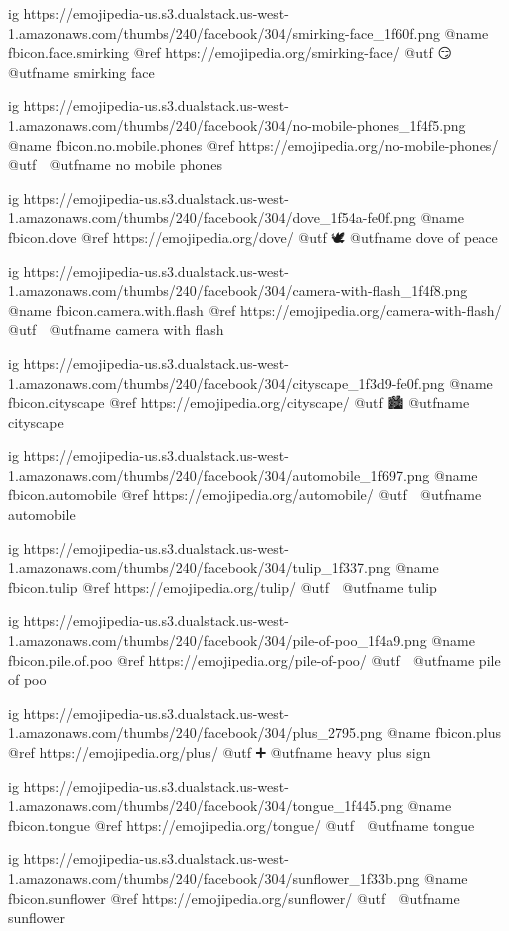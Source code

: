   ig https://emojipedia-us.s3.dualstack.us-west-1.amazonaws.com/thumbs/240/facebook/304/smirking-face_1f60f.png
  @name fbicon.face.smirking
  @ref https://emojipedia.org/smirking-face/
  @utf 😏
  @utfname smirking face

  ig https://emojipedia-us.s3.dualstack.us-west-1.amazonaws.com/thumbs/240/facebook/304/no-mobile-phones_1f4f5.png
  @name fbicon.no.mobile.phones
  @ref https://emojipedia.org/no-mobile-phones/
  @utf 📵
  @utfname no mobile phones

  ig https://emojipedia-us.s3.dualstack.us-west-1.amazonaws.com/thumbs/240/facebook/304/dove_1f54a-fe0f.png
  @name fbicon.dove
  @ref https://emojipedia.org/dove/
  @utf 🕊️
  @utfname dove of peace

  ig https://emojipedia-us.s3.dualstack.us-west-1.amazonaws.com/thumbs/240/facebook/304/camera-with-flash_1f4f8.png
  @name fbicon.camera.with.flash
  @ref https://emojipedia.org/camera-with-flash/
  @utf 📸
  @utfname camera with flash

  ig https://emojipedia-us.s3.dualstack.us-west-1.amazonaws.com/thumbs/240/facebook/304/cityscape_1f3d9-fe0f.png
  @name fbicon.cityscape
  @ref https://emojipedia.org/cityscape/
  @utf 🏙️
  @utfname cityscape

  ig https://emojipedia-us.s3.dualstack.us-west-1.amazonaws.com/thumbs/240/facebook/304/automobile_1f697.png
  @name fbicon.automobile
  @ref https://emojipedia.org/automobile/
  @utf 🚗
  @utfname automobile

  ig https://emojipedia-us.s3.dualstack.us-west-1.amazonaws.com/thumbs/240/facebook/304/tulip_1f337.png
  @name fbicon.tulip
  @ref https://emojipedia.org/tulip/
  @utf 🌷
  @utfname tulip
  
  ig https://emojipedia-us.s3.dualstack.us-west-1.amazonaws.com/thumbs/240/facebook/304/pile-of-poo_1f4a9.png
  @name fbicon.pile.of.poo
  @ref https://emojipedia.org/pile-of-poo/
  @utf 💩
  @utfname pile of poo

  ig https://emojipedia-us.s3.dualstack.us-west-1.amazonaws.com/thumbs/240/facebook/304/plus_2795.png
  @name fbicon.plus
  @ref https://emojipedia.org/plus/
  @utf ➕
  @utfname heavy plus sign

  ig https://emojipedia-us.s3.dualstack.us-west-1.amazonaws.com/thumbs/240/facebook/304/tongue_1f445.png
  @name fbicon.tongue
  @ref https://emojipedia.org/tongue/
  @utf 👅
  @utfname tongue

  ig https://emojipedia-us.s3.dualstack.us-west-1.amazonaws.com/thumbs/240/facebook/304/sunflower_1f33b.png
  @name fbicon.sunflower
  @ref https://emojipedia.org/sunflower/
  @utf 🌻
  @utfname sunflower

